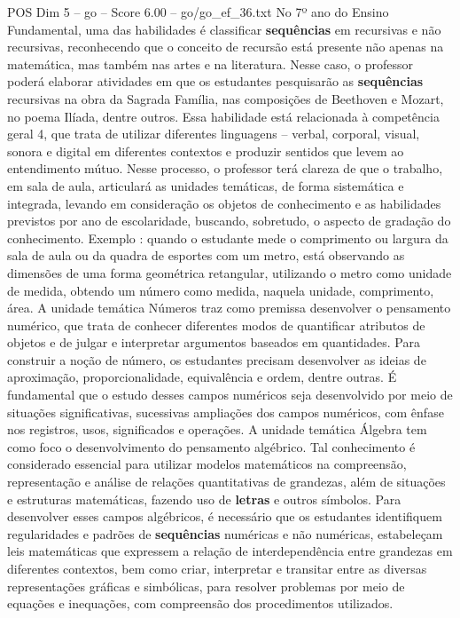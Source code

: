 \begin{textsample}{POS Dim 5 – go – Score 6.00 – go/go\_ef\_36.txt}  \label{ex:f5_pos_012}
No 7º ano do Ensino Fundamental, uma das habilidades é classificar \textbf{sequências} em recursivas e não recursivas, reconhecendo que o conceito de recursão está presente não apenas na matemática, mas também nas artes e na literatura.
Nesse caso, o professor poderá elaborar atividades em que os estudantes pesquisarão as \textbf{sequências} recursivas na obra da Sagrada Família, nas composições de Beethoven e Mozart, no poema Ilíada, dentre outros.
Essa habilidade está relacionada à competência geral 4, que trata de utilizar diferentes linguagens – verbal, corporal, visual, sonora e digital em diferentes contextos e produzir sentidos que levem ao entendimento mútuo.
Nesse processo, o professor terá clareza de que o trabalho, em sala de aula, articulará as unidades temáticas, de forma sistemática e integrada, levando em consideração os objetos de conhecimento e as habilidades previstos por ano de escolaridade, buscando, sobretudo, o aspecto de gradação do conhecimento.
Exemplo : quando o estudante mede o comprimento ou largura da sala de aula ou da quadra de esportes com um metro, está observando as dimensões de uma forma geométrica retangular, utilizando o metro como unidade de medida, obtendo um número como medida, naquela unidade, comprimento, área.
A unidade temática Números traz como premissa desenvolver o pensamento numérico, que trata de conhecer diferentes modos de quantificar atributos de objetos e de julgar e interpretar argumentos baseados em quantidades.
Para construir a noção de número, os estudantes precisam desenvolver as ideias de aproximação, proporcionalidade, equivalência e ordem, dentre outras.
É fundamental que o estudo desses campos numéricos seja desenvolvido por meio de situações significativas, sucessivas ampliações dos campos numéricos, com ênfase nos registros, usos, significados e operações.
A unidade temática Álgebra tem como foco o desenvolvimento do pensamento algébrico.
Tal conhecimento é considerado essencial para utilizar modelos matemáticos na compreensão, representação e análise de relações quantitativas de grandezas, além de situações e estruturas matemáticas, fazendo uso de \textbf{letras} e outros símbolos.
Para desenvolver esses campos algébricos, é necessário que os estudantes identifiquem regularidades e padrões de \textbf{sequências} numéricas e não numéricas, estabeleçam leis matemáticas que expressem a relação de interdependência entre grandezas em diferentes contextos, bem como criar, interpretar e transitar entre as diversas representações gráficas e simbólicas, para resolver problemas por meio de equações e inequações, com compreensão dos procedimentos utilizados.

\end{textsample}
